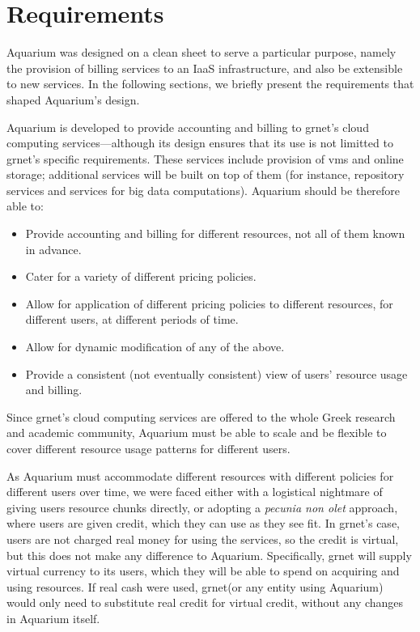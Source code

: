\documentclass[letterpaper,twocolumn,10pt]{article}
\newcommand{\grnet}{{\sc grnet}\xspace}
\begin{document}
\section{Requirements}

Aquarium was designed on a clean sheet to serve a particular purpose,
namely the provision of billing services to an IaaS infrastructure,
and also be extensible to new services. In the following sections, we
briefly present the requirements that shaped Aquarium's design.

Aquarium is developed to provide accounting and billing to \grnet's
cloud computing services---although its design ensures that its use is
not limitted to \grnet's specific requirements. These services include
provision of {\sc vm}s and online storage; additional services will be
built on top of them (for instance, repository services and services
for big data computations). Aquarium should be therefore able to:
\begin{itemize}
\item Provide accounting and billing for different resources, not all of
them known in advance. 
\item Cater for a variety of different pricing policies.
\item Allow for application of different pricing policies to different
  resources, for different users, at different periods of time.
\item Allow for dynamic modification of any of the above.
\item Provide a consistent (not eventually consistent) view of users'
  resource usage and billing.
\end{itemize}

Since \grnet's cloud computing services are offered to the whole Greek
research and academic community, Aquarium must be able to scale and be
flexible to cover different resource usage patterns for different
users.

As Aquarium must accommodate different resources with different
policies for different users over time, we were faced either with a
logistical nightmare of giving users resource chunks directly, or
adopting a \emph{pecunia non olet} approach, where users are given
credit, which they can use as they see fit. In \grnet's case, users
are not charged real money for using the services, so the credit is
virtual, but this does not make any difference to Aquarium.
Specifically, \grnet will supply virtual currency to its users, which
they will be able to spend on acquiring and using resources. If real
cash were used, \grnet (or any entity using Aquarium) would only need
to substitute real credit for virtual credit, without any changes in
Aquarium itself.
\end{document}

